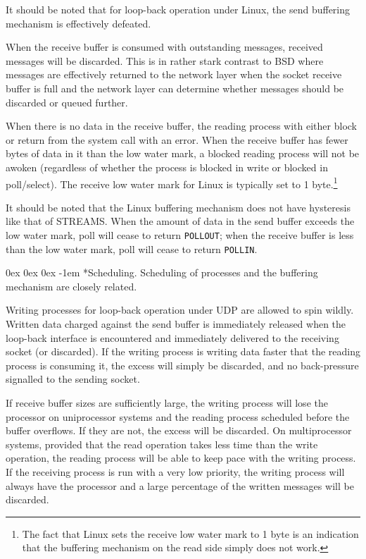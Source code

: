 \documentclass[letterpaper,final,notitlepage,twocolumn,10pt,twoside]{article}
\makeatletter
\let\normalsize\small
\let\small\footnotesize
\let\footnotesize\scriptsize
\let\scriptsize\tiny
\renewcommand\subparagraph{\@startsection{subparagraph}{5}{\parindent}%
                                       {0ex \@plus 0ex \@minus 0ex}%
                                       {-1em}%
                                      {\normalfont\normalsize\bfseries\slshape}}
\makeatother
\begin{document}
It should be noted that for loop-back operation under Linux, the send
buffering mechanism is effectively defeated.

When the receive buffer is consumed with outstanding messages, received
messages will be discarded.  This is in rather stark contrast to BSD where
messages are effectively returned to the network layer when the socket receive
buffer is full and the network layer can determine whether messages should be
discarded or queued further.

When there is no data in the receive buffer, the reading process with either
block or return from the system call with an error.  When the receive buffer
has fewer bytes of data in it than the low water mark, a blocked reading
process will not be awoken (regardless of whether the process is blocked in
write or blocked in poll/select).  The receive low water mark for Linux is
typically set to 1 byte.\footnote{The fact that Linux sets the receive low
water mark to 1 byte is an indication that the buffering mechanism on the read
side simply does not work.}

It should be noted that the Linux buffering mechanism does not have hysteresis
like that of STREAMS.  When the amount of data in the send buffer exceeds the
low water mark, poll will cease to return \texttt{POLLOUT}; when the receive
buffer is less than the low water mark, poll will cease to return
\texttt{POLLIN}.

\subparagraph*{Scheduling.} Scheduling of processes and the buffering
mechanism are closely related.

Writing processes for loop-back operation under UDP are allowed to spin
wildly.  Written data charged against the send buffer is immediately released
when the loop-back interface is encountered and immediately delivered to the
receiving socket (or discarded).  If the writing process is writing data
faster that the reading process is consuming it, the excess will simply be
discarded, and no back-pressure signalled to the sending socket.

If receive buffer sizes are sufficiently large, the writing process will lose
the processor on uniprocessor systems and the reading process scheduled before
the buffer overflows.  If they are not, the excess will be discarded.  On
multiprocessor systems, provided that the read operation takes less time than
the write operation, the reading process will be able to keep pace with the
writing process.  If the receiving process is run with a very low priority,
the writing process will always have the processor and a large percentage of
the written messages will be discarded.
\end{document}
